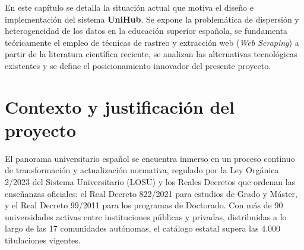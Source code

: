 En este capítulo se detalla la situación actual que motiva el diseño e implementación del sistema \textbf{UniHub}. Se expone la problemática de dispersión y heterogeneidad de los datos en la educación superior española, se fundamenta teóricamente el empleo de técnicas de rastreo y extracción web (\textit{Web Scraping}) a partir de la literatura científica reciente, se analizan las alternativas tecnológicas existentes y se define el posicionamiento innovador del presente proyecto.

\section{Contexto y justificación del proyecto}
El panorama universitario español se encuentra inmerso en un proceso continuo de transformación y actualización normativa, regulado por la Ley Orgánica 2/2023 del Sistema Universitario (LOSU) \cite{ley_organica_2_2023} y los Reales Decretos que ordenan las enseñanzas oficiales: el Real Decreto 822/2021 \cite{rd822_2021} para estudios de Grado y Máster, y el Real Decreto 99/2011 \cite{rd99_2011} para los programas de Doctorado. Con más de 90 universidades activas entre instituciones públicas y privadas, distribuidas a lo largo de las 17 comunidades autónomas, el catálogo estatal supera las 4.000 titulaciones vigentes.

